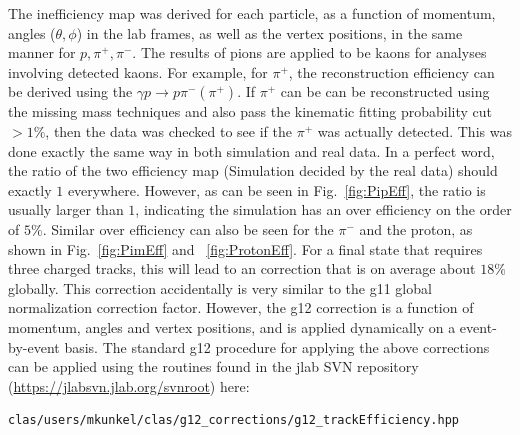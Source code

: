 The inefficiency map was derived for each particle, as a function of momentum, angles ($\theta, \phi$) in the lab frames, as well as the vertex positions, in the same manner for $p, \pi^+, \pi^-$. The results of pions are applied to be kaons for analyses involving detected kaons. For example, for $\pi^+$, the reconstruction efficiency can be derived using the $ \gamma p \rightarrow p \pi^- (\pi^+)$. If $\pi^+$ can be can be reconstructed using the missing mass techniques and also pass the kinematic fitting probability cut $>1 \%$, then the data was checked to see if the $\pi^+$ was actually detected. This was done exactly the same way in both simulation and real data. In a perfect word, the ratio of the two efficiency map (Simulation decided by the real data) should exactly $1$ everywhere. However, as can be seen in  Fig.~\ref{fig:PipEff}, the ratio is usually larger than $1$, indicating the simulation has an over efficiency on the order of $5 \%$. Similar over efficiency can also be seen for the $\pi^-$ and the proton, as shown in Fig.~\ref{fig:PimEff} and ~\ref{fig:ProtonEff}. For a final state that requires three charged tracks, this will lead to an correction that is on average about $18 \%$ globally. This correction accidentally is very similar to the g11 global normalization correction factor. However, the g12 correction is a function of momentum, angles and vertex positions, and is applied dynamically on a event-by-event basis. The standard g12 procedure for applying the above corrections can be applied using the routines found in the jlab SVN repository (\url{https://jlabsvn.jlab.org/svnroot}) here:
\begin{verbatim}
clas/users/mkunkel/clas/g12_corrections/g12_trackEfficiency.hpp
\end{verbatim}

